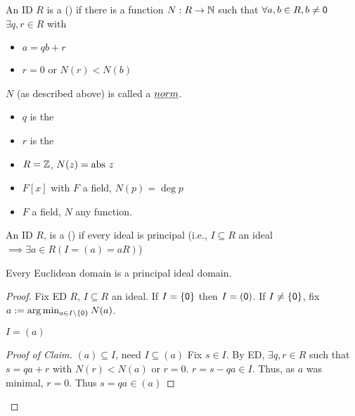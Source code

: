 \documentclass[notes.tex]{subfiles}
\begin{document}
\begin{defn}
	An ID $R$ is a  () if there is a function $N:R\to \mathbb{N}$ such that $\forall a, b\in R, b\ne \mathsf{0}$ $\exists q , r\in R $ with
	\begin{itemize}
    \item $a=qb+r$
    \item $r=0$ or $N(r) < N(b)$
  \end{itemize}
\end{defn}

\begin{notation}
	$N$ (as described above) is called a $\kw{norm}$.
	\begin{itemize}
		\item $q$ is the 
		\item $r$ is the 
	\end{itemize}
\end{notation}

\begin{eg}\leavevmode
	\begin{itemize}
		\item $R = \mathbb{Z}$, $N(z) = \mathrm{abs\ } z$
		\item $F[x]$ with $F$ a field, $N(p) = \deg p$
		\item $F$ a field, $N$ any function.
	\end{itemize}
\end{eg}

\begin{defn}
	An ID $R$, is a  () if every ideal is principal (i.e., $I\subseteq R$ an ideal $\implies \exists a\in R (I = (a) = aR)$)
\end{defn}

\begin{proposition}
	Every Euclidean domain is a principal ideal domain.
\end{proposition}
\begin{proof}
	Fix ED $R$, $I\subseteq R$ an ideal. If $I = \{\mathsf{0}\}$ then $I = (\mathsf{0})$. If $I \ne \{\mathsf{0}\}$, fix $a := \arg\min_{a\in I\setminus\{\mathsf{0}\}} N(a)$.
	\begin{claim}
		$I=(a)$
	\end{claim}
	\begin{proof}[Proof of Claim]
		$(a)\subseteq I$, need $I\subseteq (a)$ Fix $s\in I$. By ED, $\exists q, r\in R$ such that $s=qa+r$ with $N(r) < N(a)$ or $r=0$. $r = s-qa\in I$. Thus, as $a$ was minimal, $r=0$. Thus $s=qa \in (a)$
	\end{proof}
\end{proof}
\end{document}
